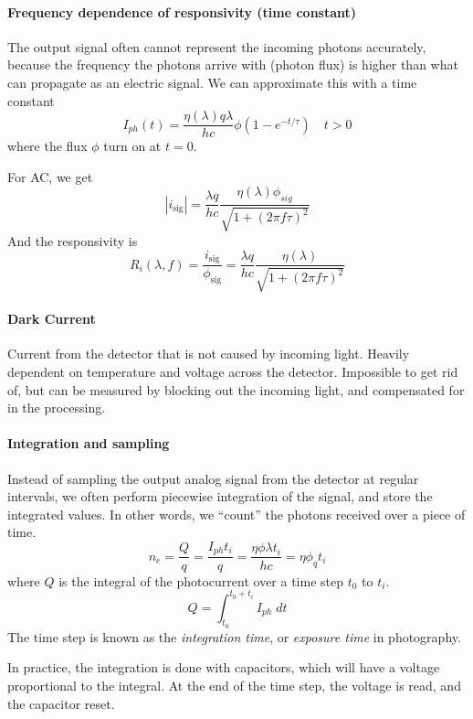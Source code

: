 \documentclass[article]{memoir}
\begin{document}
\paragraph{Frequency dependence of responsivity (time constant)}
The output signal often cannot represent the incoming photons accurately, because the frequency the photons arrive with (photon flux) is higher than what can propagate as an electric signal. We can approximate this with a time constant
\[
    I_{ph}(t) = \frac{\eta(\lambda)q\lambda}{hc}\phi\left(1 - e^{-t/\tau}\right) \quad t > 0
\]
where the flux \(\phi\) turn on at \(t=0\).

For AC, we get
\[
    |i_{\text{sig}}| = \frac{\lambda q}{h c} \frac{\eta(\lambda) \phi_{sig}}{\sqrt{1 + (2\pi f \tau)^2}}
\]
And the responsivity is
\[
    R_i(\lambda, f) = \frac{i_{\text{sig}}}{\phi_{\text{sig}}} =  \frac{\lambda q}{h c} \frac{\eta(\lambda) }{\sqrt{1 + (2\pi f \tau)^2}}
\]
\paragraph{Dark Current}
Current from the detector that is not caused by incoming light. Heavily dependent on temperature and voltage across the detector. Impossible to get rid of, but can be measured by blocking out the incoming light, and compensated for in the processing.

\paragraph{Integration and sampling}
Instead of sampling the output analog signal from the detector at regular intervals, we often perform piecewise integration of the signal, and store the integrated values. In other words, we ``count'' the photons received over a piece of time.
\[
    n_e = \frac{Q}{q} = \frac{I_{ph} t_i}{q} = \frac{\eta \phi \lambda t_i}{hc} = \eta \phi_q t_i
\]
where \(Q\) is the integral of the photocurrent over a time step \(t_0\) to \(t_i\).
\[
    Q = \int_{t_0}^{t_0+t_i} I_{ph} \; dt
\]
The time step is known as the \emph{integration time}, or \emph{exposure time} in photography.

In practice, the integration is done with capacitors, which will have a voltage proportional to the integral. At the end of the time step, the voltage is read, and the capacitor reset. 
\end{document}
